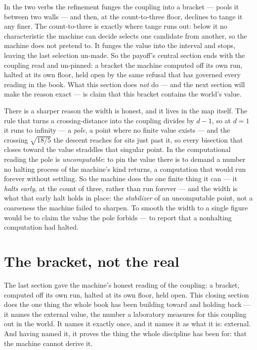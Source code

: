 In the two verbs the refinement funges the coupling into a bracket --- pools it between two walls --- and then, at the
count-to-three floor, declines to tange it any finer. The count-to-three is exactly where tange runs out: below it no
characteristic the machine can decide selects one candidate from another, so the machine does not pretend to. It funges
the value into the interval and stops, leaving the last selection un-made. So the payoff's central section ends with the
coupling read and un-pinned: a bracket the machine computed off its own run, halted at its own floor, held open by the
same refusal that has governed every reading in the book. What this section does \emph{not} do --- and the next section
will make the reason exact --- is claim that this bracket contains the world's value.

There is a sharper reason the width is honest, and it lives in the map itself. The rule that turns a crossing-distance
into the coupling divides by $d-1$, so at $d=1$ it runs to infinity --- a \emph{pole}, a point where no finite value
exists --- and the crossing $\sqrt{18/5}$ the descent reaches for sits just past it, so every bisection that closes toward
the value straddles that singular point. In the computational reading the pole is \emph{uncomputable}: to pin the value
there is to demand a number no halting process of the machine's kind returns, a computation that would run forever
without settling. So the machine does the one finite thing it can --- it \emph{halts early}, at the count of three,
rather than run forever --- and the width is what that early halt holds in place: the \emph{stabilizer} of an
uncomputable point, not a coarseness the machine failed to sharpen. To smooth the width to a single figure would be to
claim the value the pole forbids --- to report that a nonhalting computation had halted.

\section{The bracket, not the real}

The last section gave the machine's honest reading of the coupling: a bracket, computed off its own run, halted at its
own floor, held open. This closing section does the one thing the whole book has
been building toward and holding back --- it names the external value, the number a laboratory measures for this coupling
out in the world. It names it exactly once, and it names it as what it is: external. And having named it, it proves the
thing the whole discipline has been for: that the machine cannot derive it.

